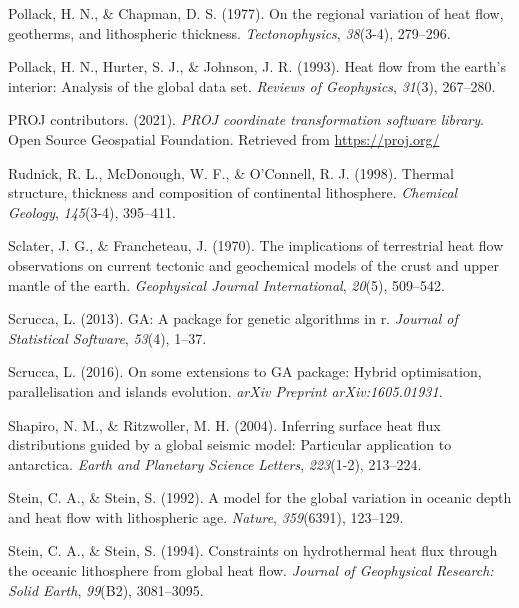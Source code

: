 \documentclass[draft,linenumbers]{agujournal2018}
\newlength{\cslhangindent}
\newenvironment{CSLReferences}[3] %
 {%
  \setlength{\parindent}{0pt}
  \ifodd #1 \everypar{\setlength{\hangindent}{\cslhangindent}}\ignorespaces\fi
  \ifnum #2 > 0
  \setlength{\parskip}{#2\baselineskip}
  \fi
 }%
 {}
\begin{document}
\begin{CSLReferences}{1}{0}
\leavevmode{}%
Pollack, H. N., \& Chapman, D. S. (1977). On the regional variation of
heat flow, geotherms, and lithospheric thickness. \emph{Tectonophysics},
\emph{38}(3-4), 279--296.

\leavevmode{}%
Pollack, H. N., Hurter, S. J., \& Johnson, J. R. (1993). Heat flow from
the earth's interior: Analysis of the global data set. \emph{Reviews of
Geophysics}, \emph{31}(3), 267--280.

\leavevmode{}%
PROJ contributors. (2021). \emph{{PROJ} coordinate transformation
software library}. Open Source Geospatial Foundation. Retrieved from
\url{https://proj.org/}

\leavevmode{}%
Rudnick, R. L., McDonough, W. F., \& O'Connell, R. J. (1998). Thermal
structure, thickness and composition of continental lithosphere.
\emph{Chemical Geology}, \emph{145}(3-4), 395--411.

\leavevmode{}%
Sclater, J. G., \& Francheteau, J. (1970). The implications of
terrestrial heat flow observations on current tectonic and geochemical
models of the crust and upper mantle of the earth. \emph{Geophysical
Journal International}, \emph{20}(5), 509--542.

\leavevmode{}%
Scrucca, L. (2013). GA: A package for genetic algorithms in r.
\emph{Journal of Statistical Software}, \emph{53}(4), 1--37.

\leavevmode{}%
Scrucca, L. (2016). On some extensions to GA package: Hybrid
optimisation, parallelisation and islands evolution. \emph{arXiv
Preprint arXiv:1605.01931}.

\leavevmode{}%
Shapiro, N. M., \& Ritzwoller, M. H. (2004). Inferring surface heat flux
distributions guided by a global seismic model: Particular application
to antarctica. \emph{Earth and Planetary Science Letters},
\emph{223}(1-2), 213--224.

\leavevmode{}%
Stein, C. A., \& Stein, S. (1992). A model for the global variation in
oceanic depth and heat flow with lithospheric age. \emph{Nature},
\emph{359}(6391), 123--129.

\leavevmode{}%
Stein, C. A., \& Stein, S. (1994). Constraints on hydrothermal heat flux
through the oceanic lithosphere from global heat flow. \emph{Journal of
Geophysical Research: Solid Earth}, \emph{99}(B2), 3081--3095.


\end{CSLReferences}
\end{document}
